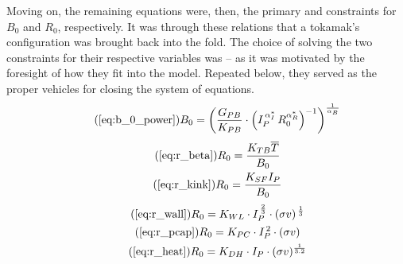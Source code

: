 Moving on, the remaining equations were, then, the primary and  constraints for $B_0$ and $R_0$, respectively. It was through these relations that a tokamak's configuration was brought back into the fold. The choice of solving the two constraints for their respective variables was  -- as it was motivated by the foresight of how they fit into the model. Repeated below, they served as the proper vehicles for closing the system of equations. 
\begin{equation}
	\tag{\ref{eq:b_0_power}}
	B_0 = \left( \frac{ G_{PB} }{ K_{PB} } \cdot \left( I_P^{\,\alpha_I^*} \, R_0^{ \alpha_R^* } \right)^{-1} \right) ^ { \frac{1}{ \alpha_B } }
\end{equation}
\begin{gather}
  \tag{\ref{eq:r_beta}}
  R_0 = \frac{ K_{TB} \overline{T} }{ B_0 } \\
	\tag{\ref{eq:r_kink}}
   R_0 = \frac{ K_{SF} I_P }{ B_0 }
\end{gather}
\begin{gather}
	\tag{\ref{eq:r_wall}}
	R_0 = K_{WL} \cdot I_P^{ \, \frac{2}{3} } \cdot (\sigma v) ^{ \, \frac{1}{3} } \\
	\tag{\ref{eq:r_pcap}}
	R_0 = K_{PC} \cdot I_P^{\,2} \cdot (\sigma v) \\
	\tag{\ref{eq:r_heat}}
	R_0 = K_{DH} \cdot I_P \cdot (\sigma v)^ {\frac{1}{3.2}}
\end{gather}

%
